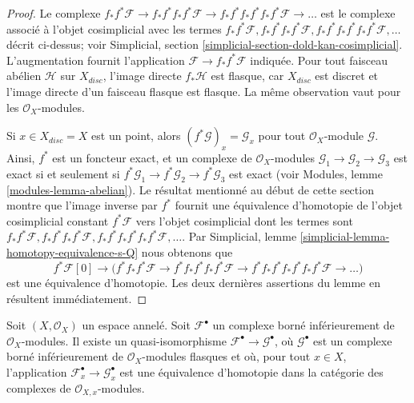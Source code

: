 {\begin{proof}

Le complexe $f_*f^*\mathcal{F} \to  f_*f^*f_*f^*\mathcal{F} \to
f_*f^*f_*f^*f_*f^*\mathcal{F} \to \ldots$ est le complexe associé à l'objet cosimplicial avec les termes
$f_*f^*\mathcal{F}, f_*f^*f_*f^*\mathcal{F},
f_*f^*f_*f^*f_*f^*\mathcal{F}, \ldots$ décrit ci-dessus; voir Simplicial, section \ref{simplicial-section-dold-kan-cosimplicial}. L'augmentation fournit l'application $\mathcal{F} \to f_*f^*\mathcal{F}$
indiquée. Pour tout faisceau abélien $\mathcal{H}$ sur $X_{disc}$, l'image directe $f_*\mathcal{H}$ est flasque, car $X_{disc}$
est discret et l'image directe d'un faisceau flasque est flasque. La même observation vaut pour les $\mathcal{O}_X$-modules.

\medskip\noindent

Si $x \in X_{disc} = X$ est un point, alors $(f^*\mathcal{G})_x = \mathcal{G}_x$
pour tout $\mathcal{O}_X$-module $\mathcal{G}$. Ainsi, $f^*$ est un foncteur exact, et un complexe de $\mathcal{O}_X$-modules
$\mathcal{G}_1 \to \mathcal{G}_2 \to \mathcal{G}_3$
est exact si et seulement si
$f^*\mathcal{G}_1 \to f^*\mathcal{G}_2 \to f^*\mathcal{G}_3$
est exact (voir Modules, lemme \ref{modules-lemma-abelian}). Le résultat mentionné au début de cette section montre que l'image inverse par $f^*$ fournit une équivalence d'homotopie de l'objet cosimplicial constant $f^*\mathcal{F}$ vers l'objet cosimplicial dont les termes sont
$f_*f^*\mathcal{F}, f_*f^*f_*f^*\mathcal{F},
f_*f^*f_*f^*f_*f^*\mathcal{F}, \ldots$. Par Simplicial, lemme \ref{simplicial-lemma-homotopy-equivalence-s-Q}
nous obtenons que
$$
f^*\mathcal{F}[0] \to \Big(
f^*f_*f^*\mathcal{F} \to
f^*f_*f^*f_*f^*\mathcal{F} \to
f^*f_*f^*f_*f^*f_*f^*\mathcal{F} \to \ldots
\Big)
$$
est une équivalence d'homotopie. Les deux dernières assertions du lemme en résultent immédiatement.

\end{proof}

\begin{lemma}

\label{lemma-godement-resolution-bounded-below}
Soit $(X, \mathcal{O}_X)$ un espace annelé. Soit $\mathcal{F}^\bullet$ un complexe borné inférieurement de $\mathcal{O}_X$-modules. Il existe un quasi-isomorphisme $\mathcal{F}^\bullet \to \mathcal{G}^\bullet$, où $\mathcal{G}^\bullet$ est un complexe borné inférieurement de $\mathcal{O}_X$-modules flasques et où, pour tout $x \in X$, l'application $\mathcal{F}^\bullet_x \to \mathcal{G}^\bullet_x$ est une équivalence d'homotopie dans la catégorie des complexes de $\mathcal{O}_{X, x}$-modules.
\end{lemma}

}
